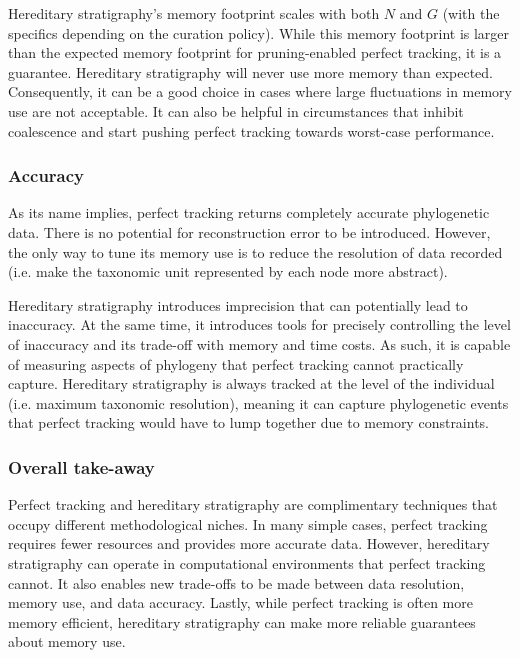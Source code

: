 Hereditary stratigraphy's memory footprint scales with both $N$ and $G$ (with the specifics depending on the curation policy).
While this memory footprint is larger than the expected memory footprint for pruning-enabled perfect tracking, it is a guarantee.
Hereditary stratigraphy will never use more memory than expected.
Consequently, it can be a good choice in cases where large fluctuations in memory use are not acceptable.
It can also be helpful in circumstances that inhibit coalescence and start pushing perfect tracking towards worst-case performance.

\subsubsection{Accuracy}

As its name implies, perfect tracking returns completely accurate phylogenetic data.
There is no potential for reconstruction error to be introduced.
However, the only way to tune its memory use is to reduce the resolution of data recorded (i.e. make the taxonomic unit represented by each node more abstract).

Hereditary stratigraphy introduces imprecision that can potentially lead to inaccuracy.
At the same time, it introduces tools for precisely controlling the level of inaccuracy and its trade-off with memory and time costs.
As such, it is capable of measuring aspects of phylogeny that perfect tracking cannot practically capture.
Hereditary stratigraphy is always tracked at the level of the individual (i.e. maximum taxonomic resolution), meaning it can capture phylogenetic events that perfect tracking would have to lump together due to memory constraints.


\subsubsection{Overall take-away}

Perfect tracking and hereditary stratigraphy are complimentary techniques that occupy different methodological niches.
In many simple cases, perfect tracking requires fewer resources and provides more accurate data.
However, hereditary stratigraphy can operate in computational environments that perfect tracking cannot.
It also enables new trade-offs to be made between data resolution, memory use, and data accuracy.
Lastly, while perfect tracking is often more memory efficient, hereditary stratigraphy can make more reliable guarantees about memory use.

